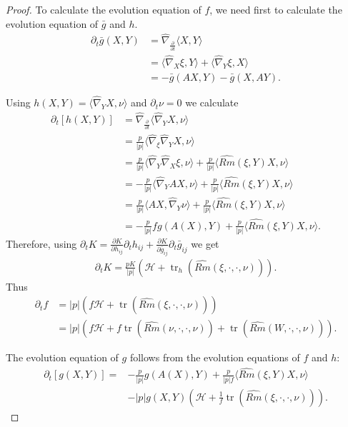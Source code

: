 \documentclass{amsart}
\theoremstyle{definition}
\theoremstyle{remark}
\numberwithin{equation}{section}
\begin{document}
\begin{proof}
To calculate the evolution equation of $ f $, we need first to calculate the evolution equation of $\bar{g}$ and $h.$
\begin{align*}
\partial_t \bar{g}(X,Y)&=\hat{\nabla}_{\frac{\partial}{\partial t}}\langle X,Y\rangle\\
&=\langle \hat{\nabla}_X\xi,Y\rangle+\langle \hat{\nabla}_Y\xi,X\rangle\\
&=-\bar{g}( AX,Y)-\bar{g}(X,AY).
\end{align*}

Using $h(X,Y)=\langle \hat{\nabla}_{Y}X, \nu\rangle$ and $\partial_t\nu=0$ we calculate
\begin{align*}
\partial_t [h(X,Y)] &= \hat{\nabla}_{\frac{\partial}{\partial t}}\langle \hat{\nabla}_{Y}X,\nu\rangle\\
&=\frac{p}{|p|}\langle \hat{\nabla}_{\xi}\hat{\nabla}_{Y}X,\nu\rangle\\
&=\frac{p}{|p|}\langle \hat{\nabla}_{Y}\hat{\nabla}_{X}\xi,\nu\rangle+ \frac{p}{|p|}\langle \widehat{Rm}(\xi,Y)X,\nu\rangle\\
&=-\frac{p}{|p|}\langle \hat{\nabla}_{Y}AX,\nu\rangle+ \frac{p}{|p|}\langle \widehat{Rm}(\xi,Y)X,\nu\rangle\\
&=\frac{p}{|p|}\langle AX,\hat{\nabla}_{Y}\nu\rangle+ \frac{p}{|p|}\langle \widehat{Rm}(\xi,Y)X,\nu\rangle\\
&=-\frac{p}{|p|} f  g(A(X),Y)+\frac{p}{|p|}\langle \widehat{Rm}(\xi,Y)X,\nu\rangle.
\end{align*}
Therefore, using $\partial_t K=\frac{\partial K}{\partial h_{ij}}\partial_th_{ij}+\frac{\partial K}{\partial \bar{g}_{ij}}\partial_t\bar{g}_{ij}$ we get
\begin{align*}
\partial_tK=\frac{pK}{|p|}(\mathcal{H}+\operatorname{tr}_h (\widehat{Rm}(\xi,\cdot,\cdot,\nu))).
\end{align*}
Thus
\begin{align}
 \partial_tf&=|p|(f\mathcal{H}+\operatorname{tr} (\widehat{Rm}(\xi,\cdot,\cdot,\nu)))\nonumber\\
&= |p|(f\mathcal{H}+f\operatorname{tr} (\widehat{Rm}(\nu,\cdot,\cdot,\nu))+\operatorname{tr} (\widehat{Rm}(W,\cdot,\cdot,\nu))).
\end{align}

The evolution equation of $g$ follows from the evolution equations of $ f $ and $h:$
\begin{align*}
\partial_t [g(X,Y)] = &-\frac{p}{|p|}g(A(X),Y)+\frac{p}{|p|f}\langle \widehat{Rm}(\xi,Y)X,\nu\rangle\\
&-
|p|g(X,Y)(\mathcal{H}+\frac{1}{f}\operatorname{tr} (\widehat{Rm}(\xi,\cdot,\cdot,\nu))).
\end{align*}


\end{proof}
\end{document}
